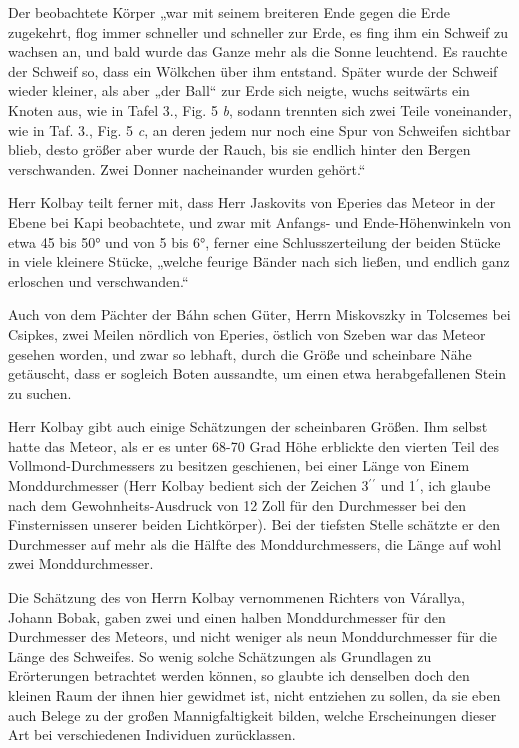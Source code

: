 \documentclass[a4paper, 11pt, oneside, german]{article}
\begin{document}
Der beobachtete Körper „war mit seinem breiteren Ende gegen die Erde zugekehrt, flog immer schneller und schneller zur Erde, es fing ihm ein Schweif zu wachsen an, und bald wurde das Ganze mehr als die Sonne leuchtend. Es rauchte der Schweif so, dass ein Wölkchen über ihm entstand. Später wurde der Schweif wieder kleiner, als aber „der Ball“ zur Erde sich neigte, wuchs seitwärts ein Knoten aus, wie in Tafel 3., Fig. 5 \emph{b}, sodann trennten sich zwei Teile voneinander, wie in Taf. 3., Fig. 5 \emph{c}, an deren jedem nur noch eine Spur von Schweifen sichtbar blieb, desto größer aber wurde der Rauch, bis sie endlich hinter den Bergen verschwanden. Zwei Donner nacheinander wurden gehört.“

Herr Kolbay teilt ferner mit, dass Herr Jaskovits von Eperies das Meteor in der Ebene bei Kapi beobachtete, und zwar mit Anfangs- und Ende-Höhenwinkeln von etwa 45 bis 50° und von 5 bis 6°, ferner eine Schlusszerteilung der beiden Stücke in viele kleinere Stücke, „welche feurige Bänder nach sich ließen, und endlich ganz erloschen und verschwanden.“

Auch von dem Pächter der Báhn schen Güter, Herrn Miskovszky in Tolcsemes bei Csipkes, zwei Meilen nördlich von Eperies, östlich von Szeben war das Meteor gesehen worden, und zwar so lebhaft, durch die Größe und scheinbare Nähe getäuscht, dass er sogleich Boten aussandte, um einen etwa herabgefallenen Stein zu suchen.

Herr Kolbay gibt auch einige Schätzungen der scheinbaren Größen. Ihm selbst hatte das Meteor, als er es unter 68-70 Grad Höhe erblickte den vierten Teil des Vollmond-Durchmessers zu besitzen geschienen, bei einer Länge von Einem Monddurchmesser (Herr Kolbay bedient sich der Zeichen 3$^{\prime}$$^{\prime}$ und 1$^{\prime}$, ich glaube nach dem Gewohnheits-Ausdruck von 12 Zoll für den Durchmesser bei den Finsternissen unserer beiden Lichtkörper). Bei der tiefsten Stelle schätzte er den Durchmesser auf mehr als die Hälfte des Monddurchmessers, die Länge auf wohl zwei Monddurchmesser.

Die Schätzung des von Herrn Kolbay vernommenen Richters von Várallya, Johann Bobak, gaben zwei und einen halben Monddurchmesser für den Durchmesser des Meteors, und nicht weniger als neun Monddurchmesser für die Länge des Schweifes. So wenig solche Schätzungen als Grundlagen zu Erörterungen betrachtet werden können, so glaubte ich denselben doch den kleinen Raum der ihnen hier gewidmet ist, nicht entziehen zu sollen, da sie eben auch Belege zu der großen Mannigfaltigkeit bilden, welche Erscheinungen dieser Art bei verschiedenen Individuen zurücklassen.
\clearpage
\end{document}
